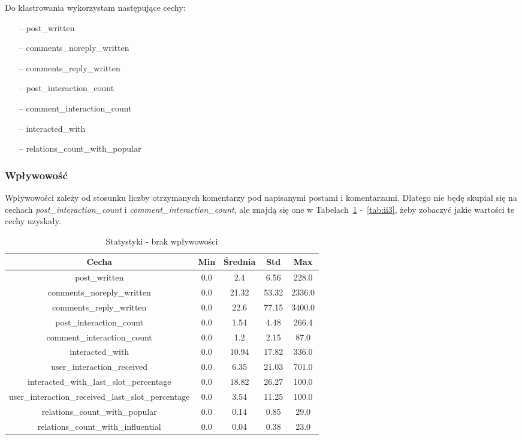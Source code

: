 \documentclass[polish,12pt]{aghthesis}
\begin{document}
Do klastrowania wykorzystam następujące cechy:

\begin{itemize}
    \setlength\itemsep{0,005em}
    \item[--] post\_written
    \item[--] comments\_noreply\_written 
    \item[--] comments\_reply\_written
    \item[--] post\_interaction\_count
    \item[--] comment\_interaction\_count 
    \item[--] interacted\_with
    \item[--] relations\_count\_with\_popular 
\end{itemize}



\subsubsection{Wpływowość}

Wpływowości zależy od stosunku liczby otrzymanych komentarzy pod napisanymi postami i komentarzami. Dlatego nie będę skupiał się na cechach \textit{post\_interaction\_count} i \textit{comment\_interaction\_count}, ale znajdą się one w Tabelach~\ref{tab:ii0} -~\ref{tab:ii3}, żeby zobaczyć jakie wartości te cechy uzyskały. 


\begin{table}[ht]
    \centering
  \begin{center}
  \begin{tabular}{|c|c|c|c|c|}
  \hline
  Cecha & Min & Średnia & Std & Max  \\
  \hline
post\_written & 0.0 & 2.4 & 6.56 & 228.0 \\
\hline
comments\_noreply\_written & 0.0 & 21.32 & 53.32 & 2336.0 \\
\hline
comments\_reply\_written & 0.0 & 22.6 & 77.15 & 3400.0 \\
\hline
post\_interaction\_count & 0.0 & 1.54 & 4.48 & 266.4 \\
\hline
comment\_interaction\_count & 0.0 & 1.2 & 2.15 & 87.0 \\
\hline
interacted\_with & 0.0 & 10.94 & 17.82 & 336.0 \\
\hline
user\_interaction\_received & 0.0 & 6.35 & 21.03 & 701.0 \\
\hline
interacted\_with\_last\_slot\_percentage & 0.0 & 18.82 & 26.27 & 100.0 \\
\hline
user\_interaction\_received\_last\_slot\_percentage & 0.0 & 3.54 & 11.25 & 100.0 \\
\hline
relations\_count\_with\_popular & 0.0 & 0.14 & 0.85 & 29.0 \\
\hline
relations\_count\_with\_influential & 0.0 & 0.04 & 0.38 & 23.0 \\
\hline
  \end{tabular}
\end{center}
\caption{Statystyki - brak wpływowości}
\label{tab:ii0}
\end{table}
\end{document}
